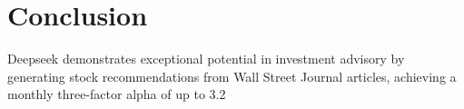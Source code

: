 \documentclass{article}
\begin{document}
\section{Conclusion}
Deepseek demonstrates exceptional potential in investment advisory by generating stock recommendations from Wall Street Journal articles, achieving a monthly three-factor alpha of up to 3.2%



\end{document}
